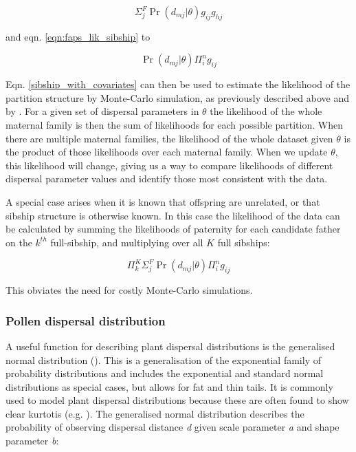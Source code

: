 \documentclass[10pt, a4paper, twocolumn]{article} %
\begin{document}
\begin{equation}\label{eqn:pairwise_with_covariates}
\Sigma_j^F \Pr(d_{mj} | \theta)g_{ij}g_{hj}
\end{equation}

and eqn. \ref{eqn:faps_lik_sibship} to

\begin{equation}
\label{sibship_with_covariates}
\Pr(d_{mj} | \theta)\Pi_i^n g_{ij}
\end{equation}

Eqn. \ref{sibship_with_covariates} can then be used to estimate the likelihood of the partition structure by Monte-Carlo simulation, as previously described above and by \cite{ellis2018efficient}.
For a given set of dispersal parameters in $\theta$ the likelihood of the whole maternal family is then the sum of likelihoods for each possible partition. When there are multiple maternal families, the likelihood of the whole dataset given $\theta$ is the product of those likelihoods over each maternal family. When we update $\theta$, this likelihood will change, giving us a way to compare likelihoods of different dispersal parameter values and identify those most consistent with the data.

A special case arises when it is known that offspring are unrelated, or that sibship structure is otherwise known. In this case the likelihood of the data can be calculated by summing the likelihoods of paternity for each candidate father on the $k^{th}$ full-sibship, and multiplying over all $K$ full sibships:

\begin{equation}
\label{lik_if_no_structure}
\Pi_k^K\Sigma_j^F\Pr(d_{mj} | \theta)\Pi_i^n g_{ij}
\end{equation}

This obviates the need for costly Monte-Carlo simulations.

\subsubsection{Pollen dispersal distribution}

A useful function for describing plant dispersal distributions is the generalised normal distribution (\cite{clark1998trees,Nadarajah2005,kremer2012long}). This is a generalisation of the exponential family of probability distributions and includes the exponential and standard normal distributions as special cases, but allows for fat and thin tails. It is commonly used to model plant dispersal distributions because these are often found to show clear kurtotis (e.g. \cite{austerlitz2004using, robledo2005patterns, klein2008pollen, burczyk2019patterns, field2011importance, ottewell2012pollen}). The generalised normal distribution describes the probability of observing dispersal distance \textit{d} given scale parameter \textit{a} and shape parameter \textit{b}:
\end{document}
